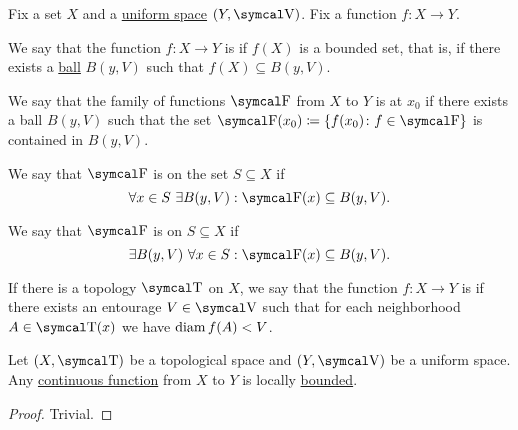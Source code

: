 \begin{Definition}\label{def:bounded_function}
  Fix a set \( X \) and a \hyperref[def:uniform_space]{uniform space} \( (Y, \CV) \). Fix a function \( f: X \to Y \).

  \begin{DefEnum}
     We say that the function \( f: X \to Y \) is  if \( f(X) \) is a bounded set, that is, if there exists a \hyperref[def:entourage/ball]{ball} \( B(y, V) \) such that \( f(X) \subseteq B(y, V) \).

     We say that the family of functions \( \CF \) from \( X \) to \( Y \) is  at \( x_0 \) if there exists a ball \( B(y, V) \) such that the set \( \CF(x_0) \coloneqq \{ f(x_0) \colon f \in \CF \} \) is contained in \( B(y, V) \).

     We say that \( \CF \) is  on the set \( S \subseteq X \) if
    \begin{equation*}
      \forall x \in S \ \exists B(y, V) : \CF(x) \subseteq B(y, V).
    \end{equation*}

     We say that \( \CF \) is  on \( S \subseteq X \) if
    \begin{equation*}
      \exists B(y, V) \ \forall x \in S : \CF(x) \subseteq B(y, V).
    \end{equation*}

     If there is a topology \( \CT \) on \( X \), we say that the function \( f: X \to Y \) is  if there exists an entourage \( V \in \CV \) such that for each neighborhood \( A \in \CT(x) \) we have \( \operatorname{diam}{f(A)} < V \).
  \end{DefEnum}
\end{Definition}

\begin{Proposition}\label{thm:continuous_implies_locally_bounded}
  Let \( (X, \CT) \) be a topological space and \( (Y, \CV) \) be a uniform space. Any \hyperref[thm:uniform_space_local_convergence/topological_source]{continuous function} from \( X \) to \( Y \) is locally \hyperref[def:bounded_function/locally_bounded]{bounded}.
\end{Proposition}
\begin{proof}
  Trivial.
\end{proof}

